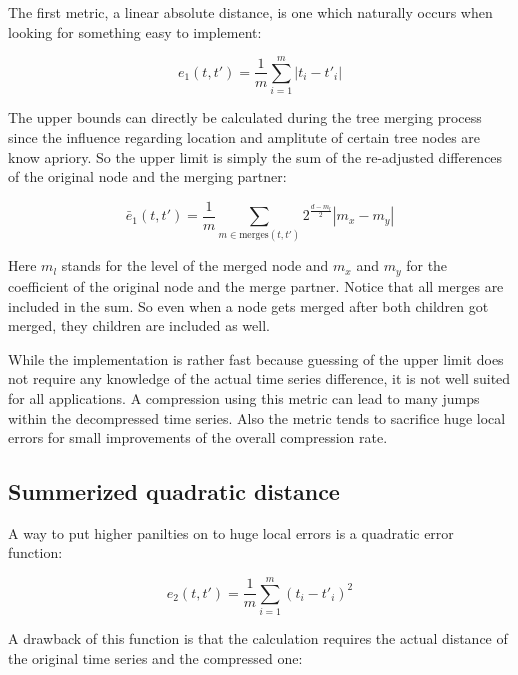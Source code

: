 The first metric, a linear absolute distance, is one which naturally occurs when looking for something easy to implement:

\begin{equation}\label{eq:e1}
    e_1\left(t, t'\right) = \frac{1}{m} \sum_{i=1}^m \left|t_i - t'_i\right|
\end{equation}

The upper bounds can directly be calculated during the tree merging process since the influence regarding location and amplitute of certain tree nodes are know apriory. So the upper limit is simply the sum of the re-adjusted differences of the original node and the merging partner:

\begin{equation}\label{eq:e1_up}
    \bar{e}_1\left(t, t'\right) = \frac{1}{m} \sum_{m \in \mathrm{merges}(t, t')} 2^\frac{d - m_l}{2} \left|m_x - m_y\right|
\end{equation}

Here $m_l$ stands for the level of the merged node and $m_x$ and $m_y$ for the coefficient of the original node and the merge partner. Notice that all merges are included in the sum. So even when a node gets merged after both children got merged, they children are included as well.

While the implementation is rather fast because guessing of the upper limit does not require any knowledge of the actual time series difference, it is not well suited for all applications. A compression using this metric can lead to many jumps within the decompressed time series. Also the metric tends to sacrifice huge local errors for small improvements of the overall compression rate.


\subsection{Summerized quadratic distance}
\label{ssec:algorithm:error:quadratic}

A way to put higher panilties on to huge local errors is a quadratic error function:

\begin{equation}\label{eq:e2}
    e_2\left(t, t'\right) = \frac{1}{m} \sum_{i=1}^m \left(t_i - t'_i\right)^2
\end{equation}

A drawback of this function is that the calculation requires the actual distance of the original time series and the compressed one:

